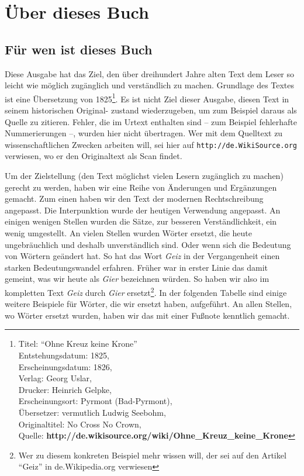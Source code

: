

\part{Über dieses Buch}


\chapter{Für wen ist dieses Buch}

Diese Ausgabe hat das Ziel, den über dreihundert Jahre alten Text dem Leser
so leicht wie möglich zugänglich und verständlich zu machen. Grundlage
des Textes ist eine Übersetzung von 1825\footnote{
Titel: "`Ohne Kreuz keine Krone"' \\
Entstehungsdatum: 1825, \\
Erscheinungsdatum: 1826, \\
Verlag: Georg Uslar, \\
Drucker: Heinrich Gelpke, \\
Erscheinungsort: Pyrmont (Bad-Pyrmont),\\
Übersetzer: vermutlich Ludwig Seebohm, \\
Originaltitel: No Cross No Crown, \\
Quelle: \textbf{http://de.wikisource.org/wiki/Ohne\_Kreuz\_keine\_Krone}}. Es
ist nicht Ziel dieser Ausgabe, diesen Text in seinem historischen Original-
zustand wiederzugeben, um zum Beispiel daraus als Quelle zu zitieren. Fehler, die im
Urtext enthalten sind -- zum Beispiel fehlerhafte Nummerierungen --, wurden hier nicht
übertragen. Wer mit dem Quelltext zu wissenschaftlichen Zwecken arbeiten will,
sei hier auf \texttt{http://de.WikiSource.org} verwiesen, wo er den
Originaltext als Scan findet.

\medskip

Um der Zielstellung (den Text möglichst vielen Lesern zugänglich zu machen)
gerecht zu werden, haben wir eine Reihe von Änderungen und Ergänzungen gemacht.
Zum einen haben wir den Text der modernen Rechtschreibung angepasst. Die
Interpunktion wurde der heutigen Verwendung angepasst. An einigen wenigen Stellen
wurden die Sätze, zur besseren Verständlichkeit, ein wenig umgestellt. An vielen
Stellen wurden Wörter ersetzt, die heute ungebräuchlich und deshalb
unverständlich sind. Oder wenn sich die Bedeutung von Wörtern geändert hat. So
hat das Wort \textit{Geiz} in der Vergangenheit einen starken Bedeutungswandel
erfahren. Früher war in erster Linie das damit gemeint, was wir heute als
\textit{Gier} bezeichnen würden. So haben wir also im kompletten Text
\textit{Geiz} durch \textit{Gier} ersetzt\footnote{Wer zu diesem konkreten
Beispiel mehr wissen will, der sei auf den Artikel "`Geiz"' in de.Wikipedia.org
verwiesen}. In der folgenden Tabelle sind einige
weitere Beispiele für Wörter, die wir ersetzt haben, aufgeführt. An allen
Stellen, wo Wörter ersetzt wurden, haben wir das mit einer Fußnote kenntlich
gemacht.

